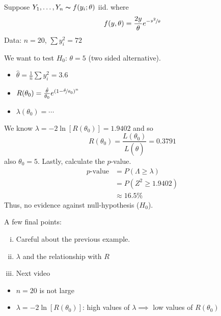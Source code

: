 \begin{exbox}
    \begin{example}
        Suppose $ Y_1,\ldots ,Y_n \thicksim f(y_i;\theta) $ iid. where
        \[ f(y,\theta)=\frac{2y}{\theta}e^{-\nicefrac{y^2}{\theta}} \]
        Data: $ n=20 $, $ \sum y_i^2=72 $

        We want to test $ H_0 $: $ \theta=5 $ (two sided alternative).
        \begin{itemize}
            \item $ \hat{\theta}=\frac{1}{n} \sum y_i^2 =3.6 $
            \item $ R(\theta_0)=\frac{\hat{\theta}}{\theta_0}e^{(1-\nicefrac{\hat{\theta}}{\theta_0})^n} $
            \item $ \lambda(\theta_0) = \cdots $
        \end{itemize}
        We know $ \lambda=-2\ln \left[ R(\theta_0) \right]=1.9402 $ and so
        \[ R(\theta_0)=\frac{L(\theta_0)}{L(\hat{\theta})}=0.3791 \]
        also $ \theta_0=5 $. Lastly, calculate the $ p $-value.
        \begin{align*}
            p\text{-value}
             & =P(\Lambda\geqslant \lambda) \\
             & =P(Z^2\geqslant 1.9402)      \\
             & \approx 16.5\%
        \end{align*}
        Thus, no evidence against null-hypothesis ($ H_0 $).
    \end{example}
\end{exbox}
A few final points:
\begin{enumerate}[(i)]
    \item Careful about the previous example.
    \item $ \lambda $ and the relationship with $ R $
    \item Next video
\end{enumerate}
\begin{itemize}
    \item $ n=20 $ is not large
    \item $ \lambda=-2\ln\left[ R(\theta_0) \right] $: high values of $ \lambda\implies $
          low values of $ R(\theta_0) $
\end{itemize}
